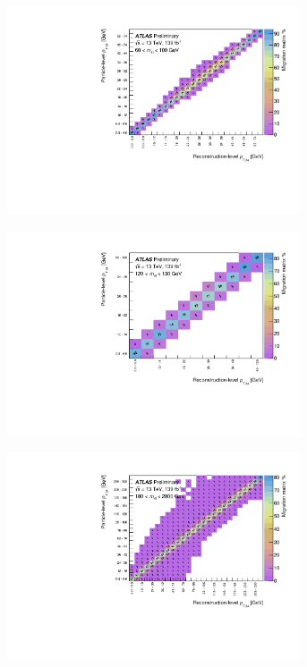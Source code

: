 \begin{figure}[htb]
  \centering
  \begin{subfigure}{.49\textwidth}\centering\includegraphics[width = 0.95\textwidth]{Figures/m4l/UnfoldingStudies/v014_matrices/pt34_m4l60-100Matrix.pdf}\end{subfigure}
  \begin{subfigure}{.49\textwidth}\centering\includegraphics[width = 0.95\textwidth]{Figures/m4l/UnfoldingStudies/v014_matrices/pt34_m4l120-130Matrix.pdf}\end{subfigure}
  \begin{subfigure}{.49\textwidth}\centering\includegraphics[width = 0.95\textwidth]{Figures/m4l/UnfoldingStudies/v014_matrices/pt34_m4l180-2000Matrix.pdf}\end{subfigure}

\end{figure}
